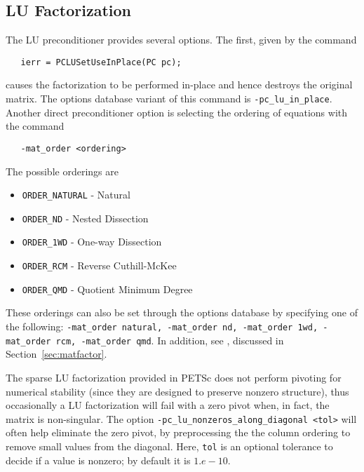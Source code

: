
\subsection{LU Factorization}

The LU preconditioner provides several options.  The first, given by
the 
command  
\begin{verbatim}
   ierr = PCLUSetUseInPlace(PC pc);
\end{verbatim}
causes the factorization to be performed in-place and hence
destroys the original matrix.  The options database variant of
this command is {\tt -pc\_lu\_in\_place}. 
Another direct preconditioner option is selecting the ordering
of equations with the command  
\begin{verbatim}
   -mat_order <ordering>
\end{verbatim}
The possible orderings are
\begin{itemize}
\item {\tt ORDER\_NATURAL} - Natural
\item {\tt ORDER\_ND} - Nested Dissection
\item {\tt ORDER\_1WD} - One-way Dissection
\item {\tt ORDER\_RCM} - Reverse Cuthill-McKee
\item {\tt ORDER\_QMD} - Quotient Minimum Degree
\end{itemize}
  
  
  
 
These orderings can also be set through the options database by specifying 
one of the following:  {\tt -mat\_order natural, -mat\_order nd, 
-mat\_order 1wd, -mat\_order rcm, -mat\_order qmd}.
In addition, see 
, discussed in Section~\ref{sec:matfactor}.

The sparse LU factorization provided in PETSc does not perform pivoting for 
numerical stability (since they are designed to preserve nonzero 
structure), thus occasionally a LU factorization will fail with a zero 
pivot when, in fact, the matrix is non-singular. The option
{\tt -pc\_lu\_nonzeros\_along\_diagonal <tol>} 
will often help eliminate the zero pivot, by preprocessing the the 
column ordering to remove small values from the diagonal. Here, {\tt tol}
is an optional tolerance to decide if a value is nonzero; by default it
is $ 1.e-10.$ 


